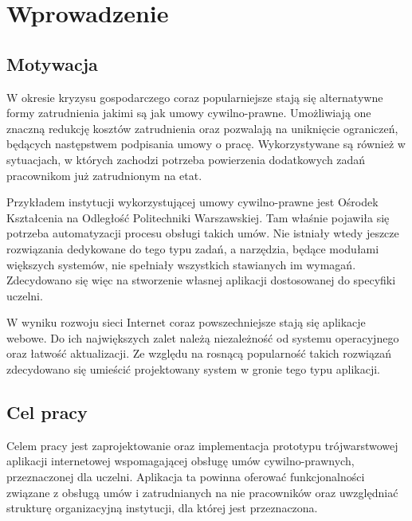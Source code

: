 \chapter{Wprowadzenie}

\section[Motywacja][Motywacja]{Motywacja}
W okresie kryzysu gospodarczego coraz popularniejsze stają się alternatywne formy zatrudnienia jakimi są jak umowy cywilno-prawne. Umożliwiają one znaczną redukcję kosztów zatrudnienia oraz pozwalają na uniknięcie ograniczeń, będących następstwem podpisania umowy o pracę. Wykorzystywane są również w sytuacjach, w których zachodzi potrzeba powierzenia dodatkowych zadań pracownikom już zatrudnionym na etat.

Przykładem instytucji wykorzystującej umowy cywilno-prawne jest Ośrodek Kształcenia na Odległość Politechniki Warszawskiej. Tam właśnie pojawiła się potrzeba automatyzacji procesu obsługi takich umów. Nie istniały wtedy jeszcze rozwiązania dedykowane do tego typu zadań, a narzędzia, będące modułami większych systemów, nie spełniały wszystkich stawianych im wymagań. Zdecydowano się więc na stworzenie własnej aplikacji dostosowanej do specyfiki uczelni.

W wyniku rozwoju sieci Internet coraz powszechniejsze stają się aplikacje webowe. Do ich największych zalet należą niezależność od systemu operacyjnego oraz łatwość aktualizacji. Ze względu na rosnącą popularność takich rozwiązań zdecydowano się umieścić projektowany system w gronie tego typu aplikacji.

\section[Cel pracy][Cel pracy]{Cel pracy}
Celem pracy jest zaprojektowanie oraz implementacja prototypu trójwarstwowej aplikacji internetowej wspomagającej obsługę umów cywilno-prawnych, przeznaczonej dla uczelni. Aplikacja ta powinna oferować funkcjonalności związane z obsługą umów i zatrudnianych na nie pracowników oraz uwzględniać strukturę organizacyjną instytucji, dla której jest przeznaczona.





